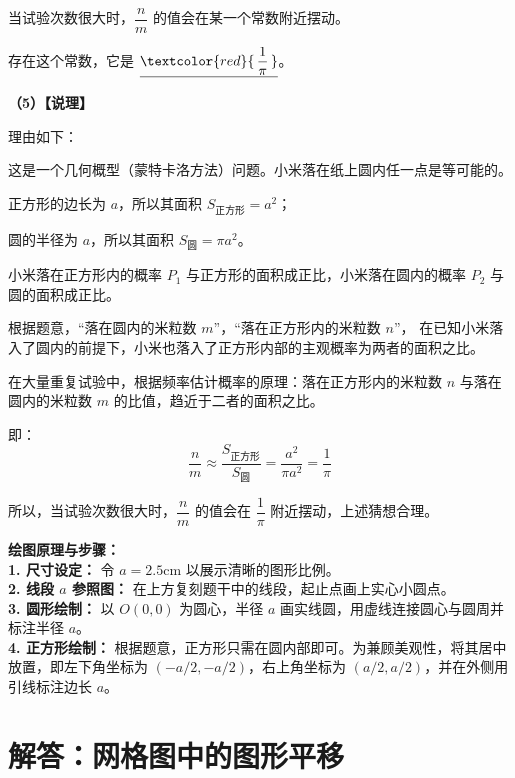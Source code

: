 当试验次数很大时，$\dfrac{n}{m}$ 的值会在某一个常数附近摆动。

存在这个常数，它是 $\underline{\textcolor{red}{\,\dfrac{1}{\pi}\,}}$。

\vspace{0.3cm}
\textbf{（5）【说理】}

理由如下：

这是一个几何概型（蒙特卡洛方法）问题。小米落在纸上圆内任一点是等可能的。

正方形的边长为 $a$，所以其面积 $S_{\text{正方形}} = a^2$；

圆的半径为 $a$，所以其面积 $S_{\text{圆}} = \pi a^2$。

小米落在正方形内的概率 $P_1$ 与正方形的面积成正比，小米落在圆内的概率 $P_2$ 与圆的面积成正比。

根据题意，“落在圆内的米粒数 $m$”，“落在正方形内的米粒数 $n$”，
在已知小米落入了圆内的前提下，小米也落入了正方形内部的主观概率为两者的面积之比。

在大量重复试验中，根据频率估计概率的原理：落在正方形内的米粒数 $n$ 与落在圆内的米粒数 $m$ 的比值，趋近于二者的面积之比。

即：
$$\frac{n}{m} \approx \frac{S_{\text{正方形}}}{S_{\text{圆}}} = \frac{a^2}{\pi a^2} = \frac{1}{\pi}$$

所以，当试验次数很大时，$\dfrac{n}{m}$ 的值会在 $\dfrac{1}{\pi}$ 附近摆动，上述猜想合理。

\vspace{0.4cm}
{\small\color{blue!70!black}
\textbf{绘图原理与步骤：}\\
\textbf{1. 尺寸设定：} 令 $a = 2.5$cm 以展示清晰的图形比例。\\
\textbf{2. 线段 $a$ 参照图：} 在上方复刻题干中的线段，起止点画上实心小圆点。\\
\textbf{3. 圆形绘制：} 以 $O(0,0)$ 为圆心，半径 $a$ 画实线圆，用虚线连接圆心与圆周并标注半径 $a$。\\
\textbf{4. 正方形绘制：} 根据题意，正方形只需在圆内部即可。为兼顾美观性，将其居中放置，即左下角坐标为 $(-a/2, -a/2)$，右上角坐标为 $(a/2, a/2)$，并在外侧用引线标注边长 $a$。
}

\newpage



\section{解答：网格图中的图形平移}


